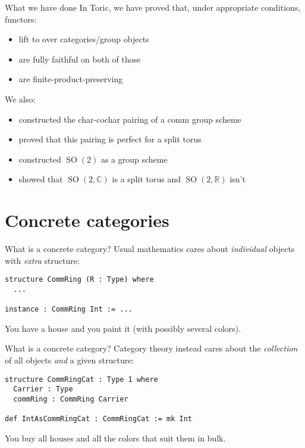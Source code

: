 \documentclass[10pt, handout]{beamer}
\DeclareMathOperator{\SO}{SO}
\providecommand{\C}{{\mathbb C}}
\providecommand{\R}{{\mathbb R}}
\begin{document}
\begin{frame}{What we have done}
    In Toric, we have proved that, under appropriate conditions, functors:

    \begin{itemize}
        \item lift to over categories/group objects
        \item are fully faithful on both of those
        \item are finite-product-preserving
    \end{itemize}

    \pause

    We also:

    \begin{itemize}
        \item constructed the char-cochar pairing of a comm group scheme
        \item proved that this pairing is perfect for a split torus
        \item constructed $\SO(2)$ as a group scheme
        \item showed that $\SO(2, \C)$ is a split torus and $\SO(2, \R)$ isn't
    \end{itemize}
\end{frame}


\section{Concrete categories}


\begin{frame}[fragile]{What is a concrete category?}
    Usual mathematics cares about \emph{individual} objects with \emph{extra} structure:
    \begin{verbatim}
structure CommRing (R : Type) where
  ...

instance : CommRing Int := ...
    \end{verbatim}
    You have a house and you paint it (with possibly several colors).
\end{frame}


\begin{frame}[fragile]{What is a concrete category?}
    Category theory instead cares about the \emph{collection} of all objects \emph{and} a given structure:
    \begin{verbatim}
structure CommRingCat : Type 1 where
  Carrier : Type
  commRing : CommRing Carrier

def IntAsCommRingCat : CommRingCat := mk Int
    \end{verbatim}
    You buy all houses and all the colors that suit them in bulk.
\end{frame}
\end{document}

